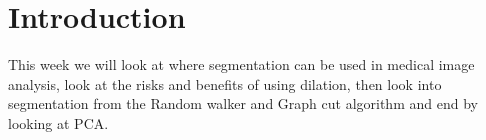 \section{Introduction}
This week we will look at where segmentation can be used in medical image analysis, look at the risks and benefits of using dilation, then look into segmentation from the Random walker and Graph cut algorithm and end by looking at PCA.